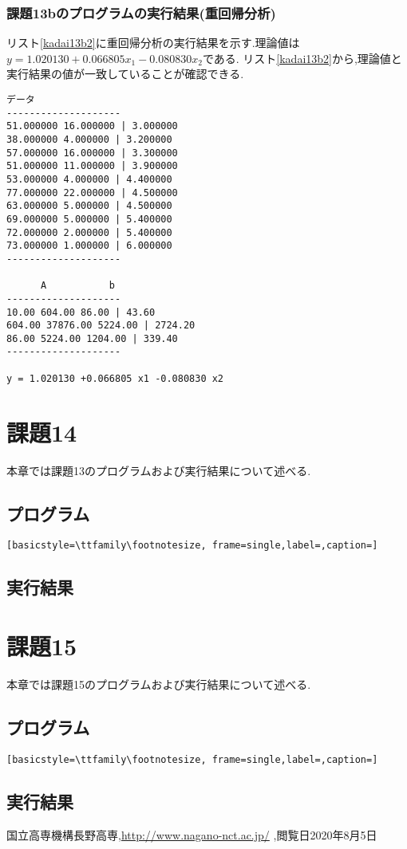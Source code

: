 \documentclass[a4j]{jarticle}
\begin{document}
      \subsubsection{課題13bのプログラムの実行結果(重回帰分析)}
      リスト\ref{kadai13b2}に重回帰分析の実行結果を示す.理論値は$y = 1.020130 +0.066805 x_1 -0.080830 x_2 $である.
      リスト\ref{kadai13b2}から,理論値と実行結果の値が一致していることが確認できる.
      \begin{lstlisting}[basicstyle=\ttfamily\footnotesize, frame=single,label=kadai13b2,caption=課題13bのプログラムの実行結果(重回帰分析)]
       データ       
--------------------
51.000000 16.000000 | 3.000000 
38.000000 4.000000 | 3.200000 
57.000000 16.000000 | 3.300000 
51.000000 11.000000 | 3.900000 
53.000000 4.000000 | 4.400000 
77.000000 22.000000 | 4.500000 
63.000000 5.000000 | 4.500000 
69.000000 5.000000 | 5.400000 
72.000000 2.000000 | 5.400000 
73.000000 1.000000 | 6.000000 
--------------------

      A           b 
--------------------
10.00 604.00 86.00 | 43.60
604.00 37876.00 5224.00 | 2724.20
86.00 5224.00 1204.00 | 339.40
--------------------

y = 1.020130 +0.066805 x1 -0.080830 x2 
      \end{lstlisting}

      \section{課題14}
      本章では課題13のプログラムおよび実行結果について述べる.
      \subsection{プログラム}
      \begin{lstlisting}[basicstyle=\ttfamily\footnotesize, frame=single,label=,caption=]
      \end{lstlisting}
      \subsection{実行結果}

      \section{課題15}
      本章では課題15のプログラムおよび実行結果について述べる.
      \subsection{プログラム}
      \begin{lstlisting}[basicstyle=\ttfamily\footnotesize, frame=single,label=,caption=]
      \end{lstlisting}
      \subsection{実行結果}


        \begin{thebibliography}{9}
            国立高専機構長野高専,\url{http://www.nagano-nct.ac.jp/} ,閲覧日2020年8月5日
          \end{thebibliography}
\end{document}
